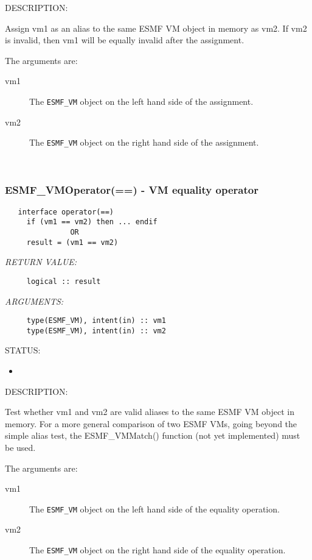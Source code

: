 {\sf DESCRIPTION:\\ }


     Assign vm1 as an alias to the same ESMF VM object in memory
     as vm2. If vm2 is invalid, then vm1 will be equally invalid after
     the assignment.
  
     The arguments are:
     \begin{description}
     \item[vm1]
       The {\tt ESMF\_VM} object on the left hand side of the assignment.
     \item[vm2]
       The {\tt ESMF\_VM} object on the right hand side of the assignment.
     \end{description}
   
 
\mbox{}\hrulefill\ 
 
\subsubsection [ESMF\_VMOperator(==)] {ESMF\_VMOperator(==) - VM equality operator}


  
\begin{verbatim}   interface operator(==)
     if (vm1 == vm2) then ... endif
               OR
     result = (vm1 == vm2)\end{verbatim}{\em RETURN VALUE:}
\begin{verbatim}     logical :: result\end{verbatim}{\em ARGUMENTS:}
\begin{verbatim}     type(ESMF_VM), intent(in) :: vm1
     type(ESMF_VM), intent(in) :: vm2\end{verbatim}
{\sf STATUS:}
   \begin{itemize}
   \item{}
   \end{itemize}
  
{\sf DESCRIPTION:\\ }


     Test whether vm1 and vm2 are valid aliases to the same ESMF
     VM object in memory. For a more general comparison of two ESMF VMs,
     going beyond the simple alias test, the ESMF\_VMMatch() function (not yet
     implemented) must be used.
  
     The arguments are:
     \begin{description}
     \item[vm1]
       The {\tt ESMF\_VM} object on the left hand side of the equality
       operation.
     \item[vm2]
       The {\tt ESMF\_VM} object on the right hand side of the equality
       operation.
     \end{description}
   
